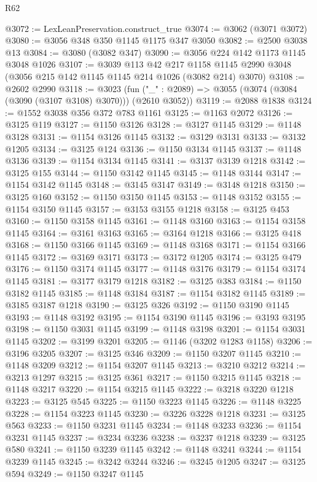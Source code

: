 \begin{lexlean}{R62}
\begin{coremodule}
@3072 := LexLeanPreservation.construct_true
@3074 := @3062 (@3071 @3072)
@3080 := @3056 @348 @350 @1145 @1175 @347 @3050
@3082 := @2500 @3038 @13
@3084 := @3080 (@3082 @347)
@3090 := @3056 @224 @142 @1173 @1145 @3048 @1026
@3107 := @3039
    @113
    @42
    @217
    @1158
    @1145
    @2990
    @3048
    (@3056 @215 @142 @1145 @1145 @214 @1026 (@3082 @214) @3070)
@3108 := @2602 @2990
@3118 := @3023
    (fun ("_" : @2089) => @3055 (@3074 (@3084 (@3090 (@3107 @3108) @3070))) (@2610 @3052))
@3119 := @2088 @1838
@3124 := @1552 @3038 @356 @372 @783 @1161
@3125 := @1163 @2072
@3126 := @3125 @119
@3127 := @1150 @3126
@3128 := @3127 @1145
@3129 := @1148 @3128
@3131 := @1154 @3126 @1145
@3132 := @3129 @3131
@3133 := @3132 @1205
@3134 := @3125 @124
@3136 := @1150 @3134 @1145
@3137 := @1148 @3136
@3139 := @1154 @3134 @1145
@3141 := @3137 @3139 @1218
@3142 := @3125 @155
@3144 := @1150 @3142 @1145
@3145 := @1148 @3144
@3147 := @1154 @3142 @1145
@3148 := @3145 @3147
@3149 := @3148 @1218
@3150 := @3125 @160
@3152 := @1150 @3150 @1145
@3153 := @1148 @3152
@3155 := @1154 @3150 @1145
@3157 := @3153 @3155 @1218
@3158 := @3125 @453
@3160 := @1150 @3158 @1145
@3161 := @1148 @3160
@3163 := @1154 @3158 @1145
@3164 := @3161 @3163
@3165 := @3164 @1218
@3166 := @3125 @418
@3168 := @1150 @3166 @1145
@3169 := @1148 @3168
@3171 := @1154 @3166 @1145
@3172 := @3169 @3171
@3173 := @3172 @1205
@3174 := @3125 @479
@3176 := @1150 @3174 @1145
@3177 := @1148 @3176
@3179 := @1154 @3174 @1145
@3181 := @3177 @3179 @1218
@3182 := @3125 @383
@3184 := @1150 @3182 @1145
@3185 := @1148 @3184
@3187 := @1154 @3182 @1145
@3189 := @3185 @3187 @1218
@3190 := @3125 @326
@3192 := @1150 @3190 @1145
@3193 := @1148 @3192
@3195 := @1154 @3190 @1145
@3196 := @3193 @3195
@3198 := @1150 @3031 @1145
@3199 := @1148 @3198
@3201 := @1154 @3031 @1145
@3202 := @3199 @3201
@3205 := @1146 (@3202 @1283 @1158)
@3206 := @3196 @3205
@3207 := @3125 @346
@3209 := @1150 @3207 @1145
@3210 := @1148 @3209
@3212 := @1154 @3207 @1145
@3213 := @3210 @3212
@3214 := @3213 @1297
@3215 := @3125 @361
@3217 := @1150 @3215 @1145
@3218 := @1148 @3217
@3220 := @1154 @3215 @1145
@3222 := @3218 @3220 @1218
@3223 := @3125 @545
@3225 := @1150 @3223 @1145
@3226 := @1148 @3225
@3228 := @1154 @3223 @1145
@3230 := @3226 @3228 @1218
@3231 := @3125 @563
@3233 := @1150 @3231 @1145
@3234 := @1148 @3233
@3236 := @1154 @3231 @1145
@3237 := @3234 @3236
@3238 := @3237 @1218
@3239 := @3125 @580
@3241 := @1150 @3239 @1145
@3242 := @1148 @3241
@3244 := @1154 @3239 @1145
@3245 := @3242 @3244
@3246 := @3245 @1205
@3247 := @3125 @594
@3249 := @1150 @3247 @1145

\end{coremodule}
\end{lexlean}
